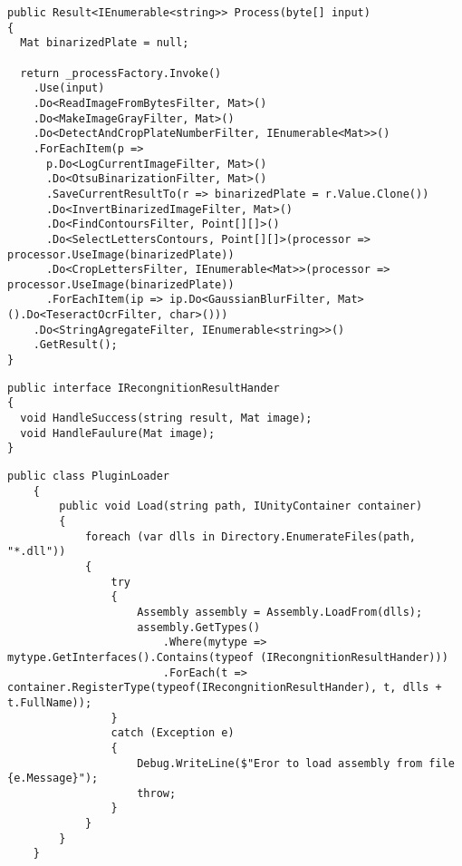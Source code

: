 \begin{lstlisting}[style=fsharpstyle,caption={Использование реализации каналы и фильтры},label=lst:pipe_and_filters_results]
public Result<IEnumerable<string>> Process(byte[] input)
{
  Mat binarizedPlate = null;

  return _processFactory.Invoke()
    .Use(input)
    .Do<ReadImageFromBytesFilter, Mat>()
    .Do<MakeImageGrayFilter, Mat>()
    .Do<DetectAndCropPlateNumberFilter, IEnumerable<Mat>>()
    .ForEachItem(p => 
      p.Do<LogCurrentImageFilter, Mat>()
      .Do<OtsuBinarizationFilter, Mat>()
      .SaveCurrentResultTo(r => binarizedPlate = r.Value.Clone())
      .Do<InvertBinarizedImageFilter, Mat>()
      .Do<FindContoursFilter, Point[][]>()
      .Do<SelectLettersContours, Point[][]>(processor => processor.UseImage(binarizedPlate))
      .Do<CropLettersFilter, IEnumerable<Mat>>(processor => processor.UseImage(binarizedPlate))
      .ForEachItem(ip => ip.Do<GaussianBlurFilter, Mat>().Do<TeseractOcrFilter, char>()))
    .Do<StringAgregateFilter, IEnumerable<string>>()
    .GetResult();
}
\end{lstlisting}

\begin{lstlisting}[style=fsharpstyle,caption={Определение интерфейса IRecongnitionResultHander}, label=lst:recognition_result_handler]
public interface IRecongnitionResultHander
{
  void HandleSuccess(string result, Mat image);
  void HandleFaulure(Mat image);
}
\end{lstlisting}

\begin{lstlisting}[style=fsharpstyle,caption={Загрузчик плагинов}, label=lst:plugin_loader]
 public class PluginLoader
    {
        public void Load(string path, IUnityContainer container)
        {
            foreach (var dlls in Directory.EnumerateFiles(path, "*.dll"))
            {
                try
                {
                    Assembly assembly = Assembly.LoadFrom(dlls);
                    assembly.GetTypes()
                        .Where(mytype => mytype.GetInterfaces().Contains(typeof (IRecongnitionResultHander)))
                        .ForEach(t => container.RegisterType(typeof(IRecongnitionResultHander), t, dlls + t.FullName));
                }
                catch (Exception e)
                {
                    Debug.WriteLine($"Eror to load assembly from file {e.Message}");
                    throw;
                }
            }
        }
    }
\end{lstlisting}

